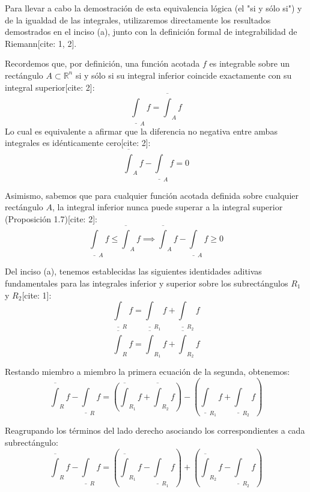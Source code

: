 \documentclass[11pt,letterpaper]{article}
\begin{document}
Para llevar a cabo la demostración de esta equivalencia lógica (el "si y sólo si") y de la igualdad de las integrales, utilizaremos directamente los resultados demostrados en el inciso (a), junto con la definición formal de integrabilidad de Riemann[cite: 1, 2].

Recordemos que, por definición, una función acotada $f$ es integrable sobre un rectángulo $A \subset \mathbb{R}^{n}$ si y sólo si su integral inferior coincide exactamente con su integral superior[cite: 2]:
\begin{equation*}
\underline{\int}_{A}f = \overline{\int}_{A}f
\end{equation*}
Lo cual es equivalente a afirmar que la diferencia no negativa entre ambas integrales es idénticamente cero[cite: 2]:
\begin{equation*}
\overline{\int}_{A}f - \underline{\int}_{A}f = 0
\end{equation*}

Asimismo, sabemos que para cualquier función acotada definida sobre cualquier rectángulo $A$, la integral inferior nunca puede superar a la integral superior (Proposición 1.7)[cite: 2]:
\begin{equation*}
\underline{\int}_{A}f \le \overline{\int}_{A}f \implies \overline{\int}_{A}f - \underline{\int}_{A}f \ge 0
\end{equation*}

Del inciso (a), tenemos establecidas las siguientes identidades aditivas fundamentales para las integrales inferior y superior sobre los subrectángulos $R_{1}$ y $R_{2}$[cite: 1]:
\begin{equation*}
\underline{\int}_{R}f = \underline{\int}_{R_{1}}f + \underline{\int}_{R_{2}}f
\end{equation*}
\begin{equation*}
\overline{\int}_{R}f = \overline{\int}_{R_{1}}f + \overline{\int}_{R_{2}}f
\end{equation*}

Restando miembro a miembro la primera ecuación de la segunda, obtenemos:
\begin{equation*}
\overline{\int}_{R}f - \underline{\int}_{R}f = \left(\overline{\int}_{R_{1}}f + \overline{\int}_{R_{2}}f\right) - \left(\underline{\int}_{R_{1}}f + \underline{\int}_{R_{2}}f\right)
\end{equation*}

Reagrupando los términos del lado derecho asociando los correspondientes a cada subrectángulo:
\begin{equation*}
\overline{\int}_{R}f - \underline{\int}_{R}f = \left(\overline{\int}_{R_{1}}f - \underline{\int}_{R_{1}}f\right) + \left(\overline{\int}_{R_{2}}f - \underline{\int}_{R_{2}}f\right)
\end{equation*}
\end{document}
